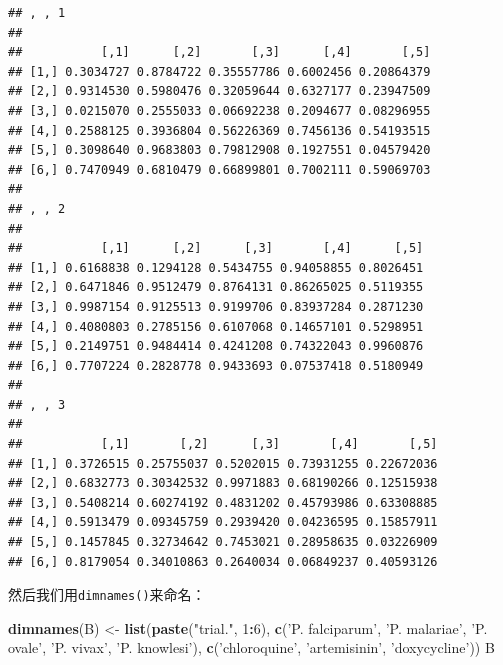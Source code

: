 \documentclass[]{book}
\newenvironment{Shaded}{\begin{snugshade}}{\end{snugshade}}
\newcommand{\DecValTok}[1]{\textcolor[rgb]{0.00,0.00,0.81}{#1}}
\newcommand{\KeywordTok}[1]{\textcolor[rgb]{0.13,0.29,0.53}{\textbf{#1}}}
\newcommand{\NormalTok}[1]{#1}
\newcommand{\OperatorTok}[1]{\textcolor[rgb]{0.81,0.36,0.00}{\textbf{#1}}}
\newcommand{\StringTok}[1]{\textcolor[rgb]{0.31,0.60,0.02}{#1}}
\begin{document}
\begin{verbatim}
## , , 1
## 
##           [,1]      [,2]       [,3]      [,4]       [,5]
## [1,] 0.3034727 0.8784722 0.35557786 0.6002456 0.20864379
## [2,] 0.9314530 0.5980476 0.32059644 0.6327177 0.23947509
## [3,] 0.0215070 0.2555033 0.06692238 0.2094677 0.08296955
## [4,] 0.2588125 0.3936804 0.56226369 0.7456136 0.54193515
## [5,] 0.3098640 0.9683803 0.79812908 0.1927551 0.04579420
## [6,] 0.7470949 0.6810479 0.66899801 0.7002111 0.59069703
## 
## , , 2
## 
##           [,1]      [,2]      [,3]       [,4]      [,5]
## [1,] 0.6168838 0.1294128 0.5434755 0.94058855 0.8026451
## [2,] 0.6471846 0.9512479 0.8764131 0.86265025 0.5119355
## [3,] 0.9987154 0.9125513 0.9199706 0.83937284 0.2871230
## [4,] 0.4080803 0.2785156 0.6107068 0.14657101 0.5298951
## [5,] 0.2149751 0.9484414 0.4241208 0.74322043 0.9960876
## [6,] 0.7707224 0.2828778 0.9433693 0.07537418 0.5180949
## 
## , , 3
## 
##           [,1]       [,2]      [,3]       [,4]       [,5]
## [1,] 0.3726515 0.25755037 0.5202015 0.73931255 0.22672036
## [2,] 0.6832773 0.30342532 0.9971883 0.68190266 0.12515938
## [3,] 0.5408214 0.60274192 0.4831202 0.45793986 0.63308885
## [4,] 0.5913479 0.09345759 0.2939420 0.04236595 0.15857911
## [5,] 0.1457845 0.32734642 0.7453021 0.28958635 0.03226909
## [6,] 0.8179054 0.34010863 0.2640034 0.06849237 0.40593126
\end{verbatim}

然后我们用\texttt{dimnames()}来命名：

\begin{Shaded}
\begin{Highlighting}[]
\KeywordTok{dimnames}\NormalTok{(B) <-}\StringTok{ }\KeywordTok{list}\NormalTok{(}\KeywordTok{paste}\NormalTok{(}\StringTok{"trial."}\NormalTok{, }\DecValTok{1}\OperatorTok{:}\DecValTok{6}\NormalTok{), }\KeywordTok{c}\NormalTok{(}\StringTok{'P. falciparum'}\NormalTok{, }\StringTok{'P. malariae'}\NormalTok{, }\StringTok{'P. ovale'}\NormalTok{, }\StringTok{'P. vivax'}\NormalTok{, }\StringTok{'P. knowlesi'}\NormalTok{), }\KeywordTok{c}\NormalTok{(}\StringTok{'chloroquine'}\NormalTok{, }\StringTok{'artemisinin'}\NormalTok{, }\StringTok{'doxycycline'}\NormalTok{))}
\NormalTok{B}
\end{Highlighting}
\end{Shaded}
\end{document}

